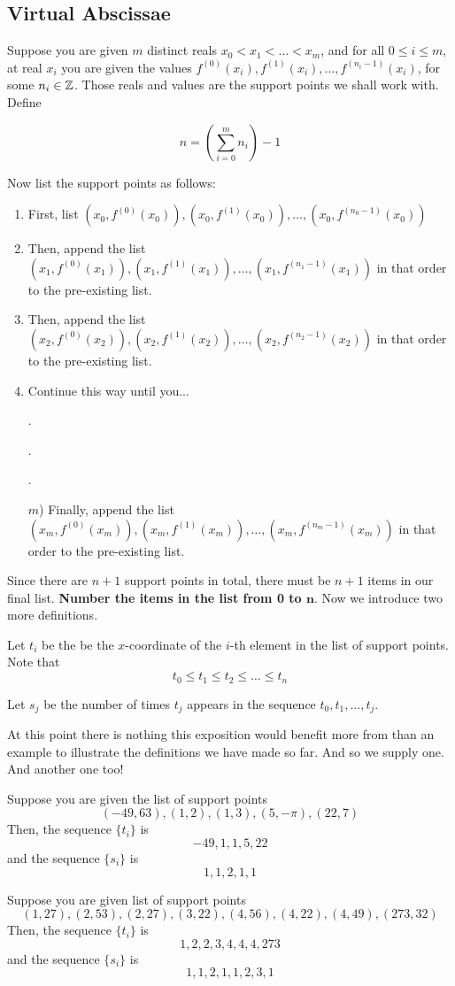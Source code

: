 \subsection{Virtual Abscissae}
Suppose you are given $m$ distinct reals $x_0 < x_1 < \dots < x_m$, and for all $0 \leq i \leq m$, at real $x_i$ you are given the values $f^{(0)}(x_i), f^{(1)}(x_i), \dots ,f^{(n_i - 1)}(x_i)$, for some $n_i \in \mathbb{Z}$. Those reals and values are the support points we shall work with. Define
\begin{defn}
\[
  n = \left(\sum_{i = 0}^m n_i\right) - 1
\]
\end{defn}
Now list the support points as follows:
\begin{enumerate}[label = \arabic*)]
\item
  First, list $(x_0, f^{(0)}(x_0)), (x_0, f^{(1)}(x_0)), \dots , (x_0, f^{(n_0 - 1)}(x_0))$
\item
  Then, append the list $(x_1, f^{(0)}(x_1)), (x_1, f^{(1)}(x_1)), \dots , (x_1, f^{(n_1 - 1)}(x_1))$ in that order to the pre-existing list.
\item
  Then, append the list $(x_2, f^{(0)}(x_2)), (x_2, f^{(1)}(x_2)), \dots , (x_2, f^{(n_2 - 1)}(x_2))$ in that order to the pre-existing list.
\item
  Continue this way until you...
\item[.]
\item[.]
\item[.]
\item[$m$)]
  Finally, append the list $(x_m, f^{(0)}(x_m)), (x_m, f^{(1)}(x_m)), \dots , (x_m, f^{(n_m - 1)}(x_m))$ in that order to the pre-existing list.
\end{enumerate}
Since there are $n+1$ support points in total, there must be $n+1$ items in our final list. \textbf{Number the items in the list from 0 to $\bm{n}$}. Now we introduce two more definitions.
\begin{defn}
  Let $t_i$ be the be the $x$-coordinate of the $i$-th element in the list of support points. Note that
  \[
    t_0 \leq t_1 \leq t_2 \leq \dots \leq t_n
  \]
\end{defn}
\begin{defn}
  Let $s_j$ be the number of times $t_j$ appears in the sequence $t_0, t_1, \dots , t_j$.
\end{defn}
At this point there is nothing this exposition would benefit more from than an example to illustrate the definitions we have made so far. And so we supply one. And another one too!
\begin{example}
  Suppose you are given the list of support points
  \[
    (-49, 63), (1, 2), (1, 3), (5, -\pi), (22, 7) 
  \]
  Then, the sequence $\{t_i \}$ is
  \[
    -49, 1, 1, 5, 22
  \]
  and the sequence $\{s_i \}$ is
  \[
    1, 1, 2, 1, 1
  \]
\end{example}
\begin{example}
  Suppose you are given list of support points
  \[
    (1, 27), (2, 53), (2,27), (3, 22), (4, 56), (4, 22), (4, 49), (273, 32)
  \]
  Then, the sequence $\{t_i \}$ is
  \[
    1, 2, 2, 3, 4, 4, 4, 273
  \]
  and the sequence $\{s_i \}$ is
  \[
    1, 1, 2, 1, 1, 2, 3, 1
  \]
\end{example}

